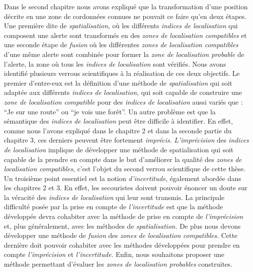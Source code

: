 Dans le second chapitre nous avons expliqué que la transformation
d'une position décrite en une zone de cordonnées connues ne pouvait ce
faire qu'en deux étapes. Une première dite de \emph{spatialisation,}
où les différents \emph{indices de localisation} qui composent une
alerte sont transformés en des \emph{zones de localisation
  compatibles} et une seconde étape de \emph{fusion} où les
différentes \emph{zones de localisation compatibles} d'une même alerte
sont combinée pour former la \emph{zone de localisation probable} de
l'alerte, \ie la zone où tous les \emph{indices de localisation} sont
vérifiés. Nous avons identifié plusieurs verrous scientifiques à la
réalisation de ces deux objectifs.  Le premier d'entre-eux est la
définition d'une méthode de \emph{spatialisation} qui soit adaptée aux
différents \emph{indices de localisation,} \ie qui soit capable de
construire une \emph{zone de localisation compatible} pour des
\emph{indices de localisation} aussi variés que : \enquote{Je sur une
  route} ou \enquote{je vois une forêt}.  Un autre problème est que la
sémantique des \emph{indices de localisation} peut être difficile à
identifier. En effet, comme nous l'avons expliqué dans le chapitre 2
et dans la seconde partie du chapitre 3, ces derniers peuvent être
fortement \emph{imprécis.}  \emph{L'imprécision} des \emph{indices de
  localisation} implique de développer une méthode de spatialisation
qui soit capable de la prendre en compte dans le but d'améliorer la
qualité des \emph{zones de localisation compatibles,} c'est l'objet du
second verrou scientifique de cette thèse.  Un troisième point
essentiel est la notion \emph{d'incertitude}, également abordée dans
les chapitres 2 et 3. En effet, les secouristes doivent pouvoir
énoncer un doute sur la véracité des \emph{indices de localisation}
qui leur sont transmis. La principale difficulté posée par la prise en
compte de \emph{l'incertitude} est que la méthode développée devra
cohabiter avec la méthode de prise en compte de \emph{l'imprécision}
et, plus généralement, avec les méthodes de \emph{spatialisation.}  De
plus nous devons développer une méthode de \emph{fusion} des
\emph{zones de localisation compatibles.} Cette dernière doit pouvoir
cohabiter avec les méthodes développées pour prendre en compte
\emph{l'imprécision} et \emph{l'incertitude.}  Enfin, nous souhaitons
proposer une méthode permettant d'évaluer les \emph{zones de
  localisation probables} construites.




